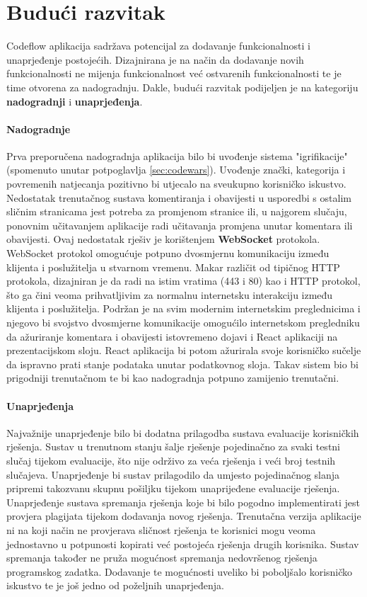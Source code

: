 \documentclass[times, utf8, zavrsni, numeric]{fer}
\begin{document}
	\chapter{Budući razvitak}
	Codeflow aplikacija sadržava potencijal za dodavanje funkcionalnosti i unaprjeđenje postojećih. Dizajnirana je na način da dodavanje novih funkcionalnosti ne mijenja funkcionalnost već ostvarenih funkcionalnosti te je time otvorena za nadogradnju.
	Dakle, budući razvitak podijeljen je na kategoriju \textbf{nadogradnji} i \textbf{unaprjeđenja}.
	\subsubsection{Nadogradnje}
	Prva preporučena nadogradnja aplikacija bilo bi uvođenje sistema "igrifikacije" (spomenuto unutar potpoglavlja \ref{sec:codewars}). Uvođenje znački, kategorija i povremenih natjecanja pozitivno bi utjecalo na sveukupno korisničko iskustvo.\\
	Nedostatak trenutačnog sustava komentiranja i obavijesti u usporedbi s ostalim sličnim stranicama jest potreba za promjenom stranice ili, u najgorem slučaju, ponovnim učitavanjem aplikacije radi učitavanja promjena unutar komentara ili obavijesti. Ovaj nedostatak rješiv je korištenjem \textbf{WebSocket} protokola. WebSocket\cite{websocket2021} protokol omogućuje potpuno dvosmjernu komunikaciju između klijenta i poslužitelja u stvarnom vremenu. Makar različit od tipičnog HTTP protokola, dizajniran je da radi na istim vratima  (443 i 80) kao i HTTP protokol, što ga čini veoma prihvatljivim za normalnu internetsku interakciju između klijenta i poslužitelja. Podržan je na svim modernim internetskim preglednicima i njegovo bi svojstvo dvosmjerne komunikacije omogućilo internetskom pregledniku da ažuriranje komentara i obavijesti istovremeno dojavi i React aplikaciji na prezentacijskom sloju. React aplikacija bi potom ažurirala svoje korisničko sučelje da ispravno prati stanje podataka unutar podatkovnog sloja. Takav sistem bio bi prigodniji trenutačnom te bi kao nadogradnja potpuno zamijenio trenutačni.
	\subsubsection{Unaprjeđenja}
	Najvažnije unaprjeđenje bilo bi dodatna prilagodba sustava evaluacije korisničkih rješenja. Sustav u trenutnom stanju šalje rješenje pojedinačno za svaki testni slučaj tijekom evaluacije, što nije održivo za veća rješenja i veći broj testnih slučajeva. Unaprjeđenje bi sustav prilagodilo da umjesto pojedinačnog slanja pripremi takozvanu skupnu  pošiljku tijekom unaprijeđene evaluacije rješenja.\\
	Unaprjeđenje sustava spremanja rješenja koje bi bilo pogodno implementirati jest provjera plagijata tijekom dodavanja novog rješenja. Trenutačna verzija aplikacije ni na koji način ne provjerava sličnost rješenja te korisnici mogu veoma jednostavno u potpunosti kopirati već postojeća rješenja drugih korisnika. Sustav spremanja također ne pruža mogućnost spremanja nedovršenog rješenja programskog zadatka. Dodavanje te mogućnosti uveliko bi poboljšalo korisničko iskustvo te je još jedno od poželjnih unaprjeđenja.
	
\end{document}
